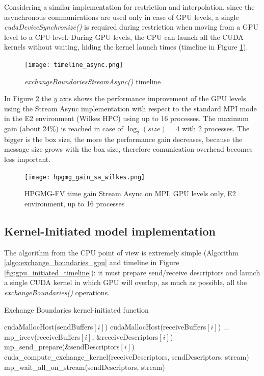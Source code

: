 \documentclass[review]{siamart1116}
\begin{document}
Considering a similar implementation for restriction and interpolation, since the asynchronous communications are used only in case of GPU levels, a single \textit{cudaDeviceSynchronize()} is required during restriction when moving from a GPU level to a CPU level. During GPU levels, the CPU can launch all the CUDA kernels without waiting, hiding the kernel launch times (timeline in Figure \ref{fig:timeline_async}).

\begin{figure}[h]
\centering
\texttt{[image: timeline\_async.png]}
\caption{\textit{exchangeBoundariesStreamAsync()} timeline}
\label{fig:timeline_async}
\end{figure}

%
In Figure \ref{fig:hpgmg_gain_sa_wilkes} the $y$ axis shows the
performance improvement of the GPU levels using the Stream Async
implementation  with respect to the standard MPI mode in the E2 environment (Wilkes HPC) using up to 16 processes.
%
The maximum gain (about 24\%) is reached in case of $\log_2(size)=4$
with 2 processes. The bigger is the box size, the more the performance
gain decreases, because the message size grows with the box size,
therefore comunication overhead becomes less important.

\begin{figure}[htb]
\centering
\texttt{[image: hpgmg\_gain\_sa\_wilkes.png]}
\caption{HPGMG-FV time gain Stream Async on MPI, GPU levels only, E2 environment, up to 16 processes}
\label{fig:hpgmg_gain_sa_wilkes}
\end{figure}

\subsection{Kernel-Initiated model implementation}\label{sec:kihpgmg}

The algorithm from the CPU point of view is extremely simple (Algorithm \ref{algo:exchange_boundaries_gpu} and timeline in Figure \ref{fig:gpu_initiated_timeline}): it must prepare send/receive descriptors and launch a single CUDA kernel in which GPU will overlap, as much as possible, all the \textit{exchangeBoundaries()} operations.

\begin{algorithm}
\small
\caption{Exchange Boundaries kernel-initiated function}
\label{algo:exchange_boundaries_gpu}
\begin{algorithmic}[1]
\State cudaMallocHost(sendBuffers$[i]$)
\State cudaMallocHost(receiveBuffers$[i]$)
\EndFor
\State ...
                \State mp\_irecv(receiveBuffers$[i]$, \&receiveDescriptors$[i]$)
        \EndFor
                \State mp\_send\_prepare(\&sendDescriptors$[i]$)
        \EndFor
        \State cuda\_compute\_exchange\_kernel(receiveDescriptors, sendDescriptors, stream)
        \State mp\_wait\_all\_on\_stream(sendDescriptors, stream)
\EndFunction
\end{algorithmic}
\end{algorithm}
\end{document}
